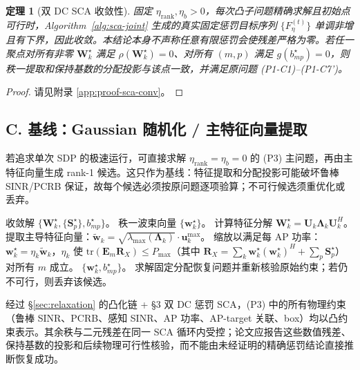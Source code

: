 \documentclass[12pt,a4paper]{article}
\newtheorem{theorem}{定理}
\newcommand{\vect}[1]{\mathbf{#1}}
\newcommand{\mat}[1]{\mathbf{#1}}
\newcommand{\tr}{\text{tr}}
\begin{document}
\begin{theorem}[双 DC SCA 收敛性]\label{thm:sca-conv}
固定 $\eta_{\text{rank}},\eta_b>0$，每次凸子问题精确求解且初始点可行时，Algorithm~\ref{alg:sca-joint} 生成的真实固定惩罚目标序列 $\{F_\eta^{(t)}\}$ 单调非增且有下界，因此收敛。本结论本身不声称任意有限惩罚会使残差严格为零。若任一聚点对所有非零 $\mat{W}_k^\star$ 满足 $\rho(\mat{W}_k^\star)=0$、对所有 $(m,p)$ 满足 $g(b_{mp}^\star)=0$，则秩一提取和保持基数的分配投影与该点一致，并满足原问题 (P1-C1)--(P1-C7')。
\end{theorem}

\begin{proof}
请见附录 \ref{app:proof-sca-conv}。
\end{proof}

\subsection*{C. 基线：Gaussian 随机化 / 主特征向量提取}

若追求单次 SDP 的极速运行，可直接求解 $\eta_{\text{rank}}=\eta_b=0$ 的 (P3) 主问题，再由主特征向量生成 rank-1 候选。这只作为基线：特征提取和分配投影可能破坏鲁棒 SINR/PCRB 保证，故每个候选必须按原问题逐项验算；不可行候选须重优化或丢弃。

\begin{algorithm}[htbp]
\caption{秩一波束提取（基线后处理）}
\label{alg:rank1}
\begin{algorithmic}[1]
\Require 收敛解 $\{\mat{W}_k^\star, \{\mat{S}_p^\star\}, b_{mp}^\star\}$。
\Ensure 秩一波束向量 $\{\vect{w}_k^\star\}$。
    \State 计算特征分解 $\mat{W}_k^\star = \mat{U}_k \mat{\Lambda}_k \mat{U}_k^H$。
    \State 提取主导特征向量：$\tilde{\vect{w}}_k = \sqrt{\lambda_{\max}(\mat{\Lambda}_k)} \cdot \mat{u}_k^{\max}$。
    \State 缩放以满足每 AP 功率：$\vect{w}_k^\star = \eta_k \tilde{\vect{w}}_k$，$\eta_k$ 使 $\tr(\mat{E}_m \mat{R}_X) \leq P_{\max}$（其中 $\mat{R}_X = \sum_k \vect{w}_k^\star (\vect{w}_k^\star)^H + \sum_p \mat{S}_p^\star$）对所有 $m$ 成立。
\EndFor
\If{$\{\vect{w}_k^\star, b_{mp}^\star\}$ 满足所有 (P1-C1)--(P1-C7')}
    \State \Return $\{\vect{w}_k^\star, b_{mp}^\star\}$。
\Else
    \State 求解固定分配恢复问题并重新核验原始约束；若仍不可行，则丢弃该候选。
\EndIf
\end{algorithmic}
\end{algorithm}

经过 \S\ref{sec:relaxation} 的凸化链 + \S3 双 DC 惩罚 SCA，(P3) 中的所有物理约束（鲁棒 SINR、PCRB、感知 SINR、AP 功率、AP-target 关联、box）均以凸约束表示。其余秩与二元残差在同一 SCA 循环内受控；论文应报告这些数值残差、保持基数的投影和后续物理可行性核验，而不能由未经证明的精确惩罚结论直接推断恢复成功。
\end{document}
